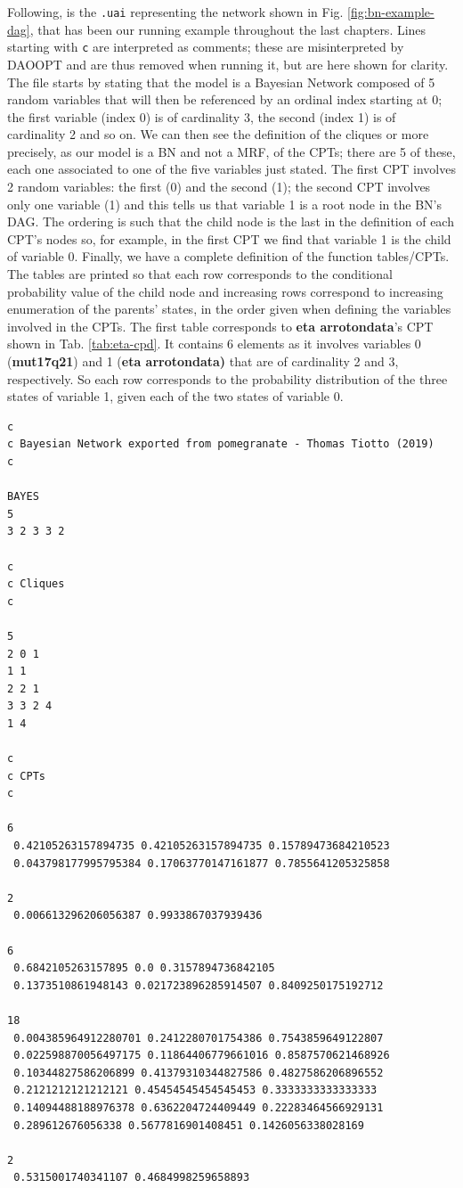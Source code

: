 Following, is the \texttt{.uai} representing the network shown in Fig. \ref{fig:bn-example-dag}, that has been our running example throughout the last chapters.
Lines starting with \texttt{c} are interpreted as comments; these are misinterpreted by DAOOPT and are thus removed when running it, but are here shown for clarity.
The file starts by stating that the model is a Bayesian Network composed of 5 random variables that will then be referenced by an ordinal index starting at 0; the first variable (index 0) is of cardinality 3, the second (index 1) is of cardinality 2 and so on.
We can then see the definition of the cliques or more precisely, as our model is a BN and not a MRF, of the CPTs; there are 5 of these, each one associated to one of the five variables just stated.
The first CPT involves 2 random variables: the first (0) and the second (1); the second CPT involves only one variable (1) and this tells us that variable 1 is a root node in the BN's DAG.
The ordering is such that the child node is the last in the definition of each CPT's nodes so, for example, in the first CPT we find that variable 1 is the child of variable 0.
Finally, we have a complete definition of the function tables/CPTs.
The tables are printed so that each row corresponds to the conditional probability value of the child node and increasing rows correspond to increasing enumeration of the parents' states, in the order given when defining the variables involved in the CPTs.
The first table corresponds to \textbf{eta arrotondata}'s CPT shown in Tab. \ref{tab:eta-cpd}.
It contains 6 elements as it involves variables 0 (\textbf{mut17q21}) and 1 (\textbf{eta arrotondata)} that are of cardinality 2 and 3, respectively.
So each row corresponds to the probability distribution of the three states of variable 1, given each of the two states of variable 0.

\begin{verbatim}
c
c Bayesian Network exported from pomegranate - Thomas Tiotto (2019)
c

BAYES
5
3 2 3 3 2 

c
c Cliques
c

5
2 0 1 
1 1 
2 2 1 
3 3 2 4 
1 4 

c
c CPTs
c

6
 0.42105263157894735 0.42105263157894735 0.15789473684210523 
 0.043798177995795384 0.17063770147161877 0.7855641205325858 

2
 0.006613296206056387 0.9933867037939436 

6
 0.6842105263157895 0.0 0.3157894736842105 
 0.1373510861948143 0.021723896285914507 0.8409250175192712 

18
 0.004385964912280701 0.2412280701754386 0.7543859649122807 
 0.022598870056497175 0.11864406779661016 0.8587570621468926 
 0.10344827586206899 0.41379310344827586 0.4827586206896552 
 0.2121212121212121 0.45454545454545453 0.3333333333333333 
 0.14094488188976378 0.6362204724409449 0.22283464566929131 
 0.289612676056338 0.5677816901408451 0.1426056338028169 

2
 0.5315001740341107 0.4684998259658893 
\end{verbatim}


